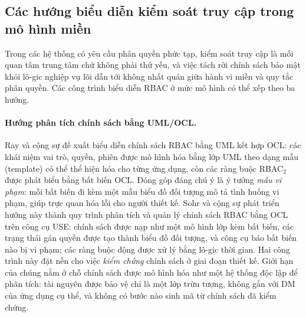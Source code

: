 \subsection{Các hướng biểu diễn kiểm soát truy cập trong mô hình miền}
\label{subsec:bieu-dien-rbac}

Trong các hệ thống có yêu cầu phân quyền phức tạp, kiểm soát truy cập là mối quan tâm trung tâm chứ không phải thứ yếu, và việc tách rời chính sách bảo mật khỏi lô-gic nghiệp vụ lõi dẫn tới không nhất quán giữa hành vi miền và quy tắc phân quyền. Các công trình biểu diễn RBAC ở mức mô hình có thể xếp theo ba hướng.

\paragraph{Hướng phân tích chính sách bằng UML/OCL.}
Ray và cộng sự \cite{ray2004} đề xuất biểu diễn chính sách RBAC bằng UML kết hợp OCL: các khái niệm vai trò, quyền, phiên được mô hình hóa bằng lớp UML theo dạng mẫu (template) có thể thể hiện hóa cho từng ứng dụng, còn các ràng buộc RBAC$_2$ được phát biểu bằng bất biến OCL. Đóng góp đáng chú ý là ý tưởng \emph{mẫu vi phạm}: mỗi bất biến đi kèm một mẫu biểu đồ đối tượng mô tả tình huống vi phạm, giúp trực quan hóa lỗi cho người thiết kế. Sohr và cộng sự \cite{sohr2008} phát triển hướng này thành quy trình phân tích và quản lý chính sách RBAC bằng OCL trên công cụ USE: chính sách được nạp như một mô hình lớp kèm bất biến, các trạng thái gán quyền được tạo thành biểu đồ đối tượng, và công cụ báo bất biến nào bị vi phạm; các ràng buộc động được xử lý bằng lô-gic thời gian. Hai công trình này đặt nền cho việc \emph{kiểm chứng} chính sách ở giai đoạn thiết kế. Giới hạn của chúng nằm ở chỗ chính sách được mô hình hóa như một hệ thống độc lập để phân tích: tài nguyên được bảo vệ chỉ là một lớp trừu tượng, không gắn với DM của ứng dụng cụ thể, và không có bước nào sinh mã từ chính sách đã kiểm chứng.

